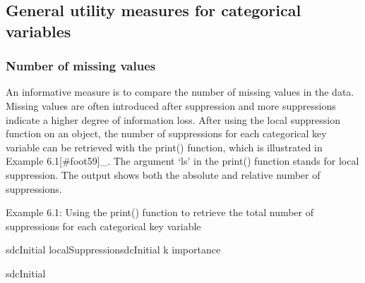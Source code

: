 \documentclass[letterpaper,10pt,english]{sphinxmanual}
\begin{document}
\subsection{General utility measures for categorical variables}
\label{\detokenize{utility:general-utility-measures-for-categorical-variables}}

\subsubsection{Number of missing values}
\label{\detokenize{utility:number-of-missing-values}}
An informative measure is to compare the number of missing values in the
data. Missing values are often introduced after suppression and more
suppressions indicate a higher degree of information loss. After using
the local suppression function on an  object, the number of
suppressions for each categorical key variable can be retrieved with the
print() function, which is illustrated in Example
6.1{[}\#foot59{]}\_. The argument ‘ls’ in the print() function
stands for local suppression. The output shows both the absolute and
relative number of suppressions.

Example 6.1: Using the print() function to retrieve the total number of
suppressions for each categorical key variable

%
\begin{sphinxVerbatim}[commandchars=\\\{\}]
sdcInitial  localSuppressionsdcInitial k   importance  

sdcInitial 

\end{sphinxVerbatim}
\end{document}
